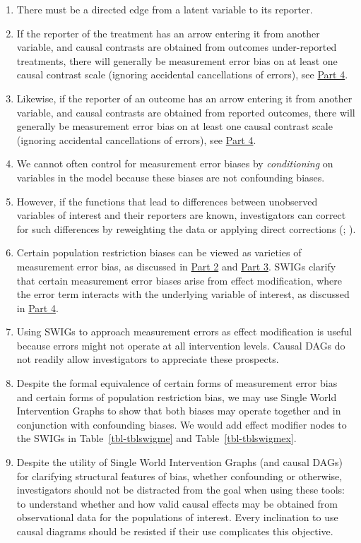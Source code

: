 \documentclass[
  single column]{article}
\providecommand{\tightlist}{%
  \setlength{\itemsep}{0pt}\setlength{\parskip}{0pt}}\usepackage{longtable,booktabs,array}
\begin{document}
\begin{enumerate}
\def\labelenumi{\arabic{enumi}.}
\tightlist
\item
  There must be a directed edge from a latent variable to its reporter.
\item
  If the reporter of the treatment has an arrow entering it from another
  variable, and causal contrasts are obtained from outcomes
  under-reported treatments, there will generally be measurement error
  bias on at least one causal contrast scale (ignoring accidental
  cancellations of errors), see \hyperref[id-sec-4]{Part 4}.
\item
  Likewise, if the reporter of an outcome has an arrow entering it from
  another variable, and causal contrasts are obtained from reported
  outcomes, there will generally be measurement error bias on at least
  one causal contrast scale (ignoring accidental cancellations of
  errors), see \hyperref[id-sec-4]{Part 4}.
\item
  We cannot often control for measurement error biases by
  \emph{conditioning} on variables in the model because these biases are
  not confounding biases.
\item
  However, if the functions that lead to differences between unobserved
  variables of interest and their reporters are known, investigators can
  correct for such differences by reweighting the data or applying
  direct corrections (; ).
\item
  Certain population restriction biases can be viewed as varieties of
  measurement error bias, as discussed in \hyperref[id-sec-2]{Part 2}
  and \hyperref[id-sec-3]{Part 3}. SWIGs clarify that certain
  measurement error biases arise from effect modification, where the
  error term interacts with the underlying variable of interest, as
  discussed in \hyperref[id-sec-4]{Part 4}.
\item
  Using SWIGs to approach measurement errors as effect modification is
  useful because errors might not operate at all intervention levels.
  Causal DAGs do not readily allow investigators to appreciate these
  prospects.
\item
  Despite the formal equivalence of certain forms of measurement error
  bias and certain forms of population restriction bias, we may use
  Single World Intervention Graphs to show that both biases may operate
  together and in conjunction with confounding biases. We would add
  effect modifier nodes to the SWIGs in Table~\ref{tbl-tblswigme} and
  Table~\ref{tbl-tblswigmex}.
\item
  Despite the utility of Single World Intervention Graphs (and causal
  DAGs) for clarifying structural features of bias, whether confounding
  or otherwise, investigators should not be distracted from the goal
  when using these tools: to understand whether and how valid causal
  effects may be obtained from observational data for the populations of
  interest. Every inclination to use causal diagrams should be resisted
  if their use complicates this objective.
\end{enumerate}
\end{document}
